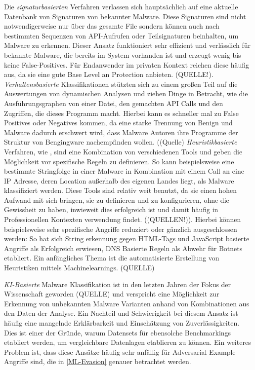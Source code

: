 Die \textit{signaturbasierten} Verfahren verlassen sich hauptsächlich auf eine aktuelle Datenbank von Signaturen von bekannter Malware. Diese Signaturen sind nicht notwendigerweise nur über das gesamte File sondern können auch nach bestimmten Sequenzen von API-Aufrufen oder Teilsignaturen beinhalten, um Malware zu erkennen. Dieser Ansatz funktioniert sehr effizient und verlässlich für bekannte Malware, die bereits im System vorhanden ist und erzeugt wenig bis keine False-Positives. Für Endanwender im privaten Kontext reichen diese häufig aus, da sie eine gute Base Level an Protection anbieten. (QUELLE!). 
\textit{Verhaltensbasierte} Klassifikationen stützten sich zu einem großen Teil auf die Auswertungen von dynamischen Analysen und ziehen Dinge in Betracht, wie die Ausführungsgraphen von einer Datei, den gemachten API Calls und den Zugriffen, die dieses Programm macht. Hierbei kann es schneller mal zu False Positives oder Negatives kommen, da eine starke Trennung von Benign und Malware dadurch erschwert wird, dass Malware Autoren ihre Programme der Struktur von Bengingware nachempfinden wollen. ((Quelle)
\textit{Heuristikbasierte} Verfahren, wie \cite{yara}, sind eine Kombination von verschiedenen Tools und geben die Möglichkeit vor spezifische Regeln zu definieren. So kann beispielsweise eine bestimmte Stringfolge in einer Malware in Kombination mit einem Call an eine IP Adresse, deren Location außerhalb des eigenen Landes liegt, als Malware klassifiziert werden. Diese Tools sind relativ weit benutzt, da sie einen hohen Aufwand mit sich bringen, sie zu definieren und zu konfigurieren, ohne die Gewissheit zu haben, inwieweit dies erfolgreich ist und damit häufig in Professionellen Kontexten verwendung findet. ((QUELLEN!)). Hierbei können beispielsweise sehr spezifische Angriffe reduziert oder gänzlich ausgeschlossen werden: So hat sich String erkennung gegen HTML-Tags und JavaScript basierte Angriffe als Erfolgreich erwiesen, DNS Basierte Regeln als Abwehr für Botnets etabliert. Ein anfängliches Thema ist die automatisierte Erstellung von Heuristiken mittels Machinelearnings. (QUELLE)

\textit{KI-Basierte} Malware Klassifikation ist in den letzten Jahren der Fokus der Wissenschaft geworden (QUELLE) und verspricht eine Möglichkeit zur Erkennung von unbekannten Malware Varianten anhand von Kombinationen aus den Daten der Analyse. Ein Nachteil und Schwierigkeit bei diesem Ansatz ist häufig eine mangelnde Erklärbarkeit und Einschätzung von Zuverlässigkeiten. Dies ist einer der Gründe, warum \cite{jiang_2024_benchmfc} Datensets für ebensolche Benchmarkings etabliert werden, um vergleichbare Datenlagen etablieren zu können. Ein weiteres Problem ist, dass diese Ansätze häufig sehr anfällig für Adversarial Example Angriffe sind, die in \ref{ML-Evasion} genauer betrachtet werden.

